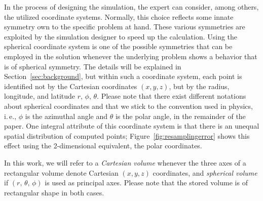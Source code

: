 \documentclass{egpubl}
\begin{document}
In the process of designing the simulation, the expert can consider, among others, the utilized coordinate systems. Normally, this choice reflects some innate symmetry own to the specific problem at hand. These various symmetries are exploited by the simulation designer to speed up the calculation. Using the spherical coordinate system is one of the possible symmetries that can be employed in the solution whenever the underlying problem shows a behavior that is of spherical symmetry. The details will be explained in Section~\ref{sec:background}, but within such a coordinate system, each point is identified not by the Cartesian coordinates $(x,y,z)$, but by the radius, longitude, and latitude $r,\, \phi,\, \theta$. Please note that there exist different notations about spherical coordinates and that we stick to the convention used in physics, i.\,e., $\phi$ is the azimuthal angle and $\theta$ is the polar angle, in the remainder of the paper. One integral attribute of this coordinate system is that there is an unequal spatial distribution of computed points; Figure~\ref{fig:resamplingerror} shows this effect using the 2-dimensional equivalent, the polar coordinates.

In this work, we will refer to a \emph{Cartesian volume} whenever the three axes of a rectangular volume denote Cartesian $(x,y,z)$ coordinates, and \emph{spherical volume} if $(r,\, \theta,\, \phi)$ is used as principal axes. Please note that the stored volume is of rectangular shape in both cases.
\end{document}
